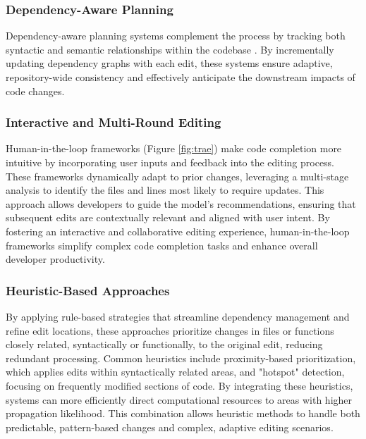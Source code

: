 \subsubsection{Dependency-Aware Planning}

Dependency-aware planning systems complement the process by tracking both syntactic and semantic relationships within the codebase \cite{coedpilot}. By incrementally updating dependency graphs with each edit, these systems ensure adaptive, repository-wide consistency and effectively anticipate the downstream impacts of code changes. 

\subsubsection{Interactive and Multi-Round Editing}

Human-in-the-loop frameworks (Figure \ref{fig:trae}) make code completion more intuitive by incorporating user inputs and feedback into the editing process. These frameworks dynamically adapt to prior changes, leveraging a multi-stage analysis to identify the files and lines most likely to require updates. This approach allows developers to guide the model's recommendations, ensuring that subsequent edits are contextually relevant and aligned with user intent. By fostering an interactive and collaborative editing experience, human-in-the-loop frameworks \cite{marscode, copilot, cursorai} simplify complex code completion tasks and enhance overall developer productivity.

\subsubsection{Heuristic-Based Approaches}

By applying rule-based strategies that streamline dependency management and refine edit locations, these approaches prioritize changes in files or functions closely related, syntactically or functionally, to the original edit, reducing redundant processing. Common heuristics \cite{coeditor, coedpilot} include proximity-based prioritization, which applies edits within syntactically related areas, and "hotspot" detection, focusing on frequently modified sections of code. By integrating these heuristics, systems can more efficiently direct computational resources to areas with higher propagation likelihood. This combination allows heuristic methods to handle both predictable, pattern-based changes and complex, adaptive editing scenarios.

